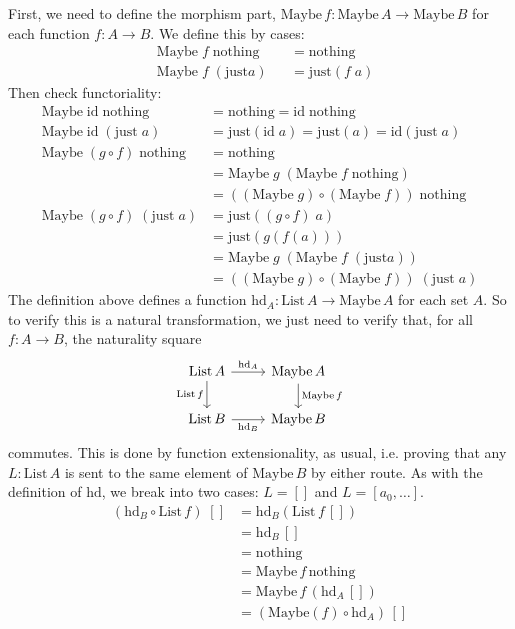 \documentclass{article}
\newcommand{\id}{\mathrm{id}}
\newcommand{\List}{\mathrm{List}}
\newcommand{\Maybe}{\mathrm{Maybe}}
\newcommand{\nothing}{\mathrm{nothing}}
\newcommand{\just}{\mathrm{just}}
\newcommand{\hd}{\mathrm{hd}}
\begin{document}
\begin{Answer}
  \Question
    First, we need to define the morphism part, $\Maybe\,f\colon \Maybe\,A \to \Maybe\,B$ for each function $f\colon A\to B$. We define this by cases:
    \begin{align*}
      &\Maybe\;f\;\nothing &&= \nothing\\
      &\Maybe\;f\;(\just a) &&= \just(f\;a)
    \end{align*}
    Then check functoriality:
    \begin{align*}
      \Maybe\;\id\;\nothing &= \nothing = \id\;\nothing\\
      \Maybe\;\id\;(\just\;a) &= \just(\id\;a) = \just(a) = \id(\just\;a)\\
      \Maybe\;(g\circ f)\;\nothing &= \nothing\\ &= \Maybe\;g\;(\Maybe\;f\;\nothing)\\ &= ((\Maybe\;g)\circ(\Maybe\;f))\;\nothing\\
      \Maybe\;(g\circ f)\;(\just\;a) &= \just((g\circ f)\;a)\\ &= \just(g(f(a)))\\ &=  \Maybe\;g\;(\Maybe\;f\;(\just a))\\ &= ((\Maybe\;g)\circ(\Maybe\;f))\;(\just\;a)
    \end{align*}
  \Question
    The definition above defines a function $\hd_A\colon\List\,A\to\Maybe\,A$ for each set $A$. So to verify this is a natural transformation, we just need to verify that, for all $f\colon A\to B$, the naturality square
    \[ \begin{tikzcd} \List\,A \arrow{r}{\hd_A}\arrow[swap]{d}{\List\,f} & \Maybe\,A \arrow{d}{\Maybe\,f}\\
        \List\,B \arrow[swap]{r}{\hd_B} & \Maybe\,B
     \end{tikzcd} \]
     commutes. This is done by function extensionality, as usual, i.e. proving that any $L\colon\List\,A$ is sent to the same element of $\Maybe\,B$ by either route. As with the definition of $\hd$, we break into two cases: $L=[]$ and $L=[a_0,\ldots]$.
     \begin{align*}
        (\hd_B\circ\List\,f)\;[]
          &= \hd_B(\List\,f\,[])\\
          &= \hd_B\,[]\\
          &= \nothing\\
          &= \Maybe\,f\,\nothing\\
          &= \Maybe\,f\,(\hd_A\,[])\\
          &= (\Maybe(f)\circ\hd_A)\,[]\\

\end{align*}
\end{Answer}
\end{document}
